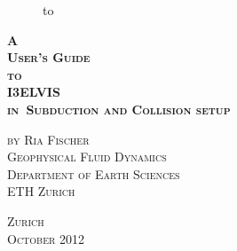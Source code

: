 %

\begin{titlepage}
\begin{figure}[b!]
  \begin{center}
    \hbox to 
  \end{center}
\end{figure}
\begin{center}
\rule{0pt}{0pt}


\begin{Large}
\vspace*{3.75cm}
\begin{huge}
\textbf{\textsc{
A\\
User's Guide\\
to\\
I3ELVIS\\
in\
Subduction and Collision setup}}\\[0.75ex]
\end{huge}
\vspace*{2.75cm}

\textsc{by Ria Fischer}\\[0.75ex]
\textsc{Geophysical Fluid Dynamics}\\[0.75ex]
\textsc{Department of Earth Sciences}\\[0.75ex]
\textsc{ETH Zurich}\\[0.75ex]
\vspace*{5.75cm}
\end{Large}

\textsc{Zurich}\\
\textsc{October 2012}\\
\vspace*{0.75cm}

\end{center}
\end{titlepage}

